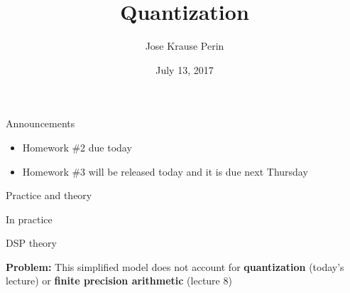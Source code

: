 \documentclass[10pt]{beamer}
\title[EE 264]{Quantization}
\author{Jose Krause Perin}
\institute{Stanford University}
\date{July 13, 2017}
\begin{document}
\begin{frame}
  \titlepage
\end{frame}


\begin{frame}{Announcements}
	\begin{itemize}
		\item Homework \#2 due today
		\item Homework \#3 will be released today and it is due next Thursday
	\end{itemize}
\end{frame}

%
\begin{frame}{Practice and theory}
\begin{block}{In practice}
	\begin{center}
		\resizebox{\linewidth}{!}{}
	\end{center}
\end{block}

\begin{block}{DSP theory}
	\begin{center}
		\resizebox{\linewidth}{!}{}
	\end{center}
	\textbf{Problem:} This simplified model does not account for \textbf{quantization} (today's lecture) or \textbf{finite precision arithmetic} (lecture 8)
\end{block}
\end{frame}
\end{document}
